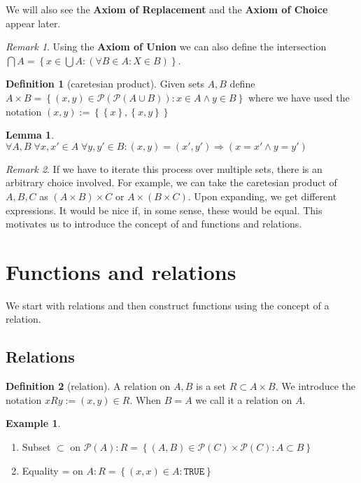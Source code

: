 \documentclass{article}
\newtheorem{lemma}[theorem]{Lemma}
\theoremstyle{definition}
\newtheorem{definition}{Definition}[subsection]
\newtheorem{eg}{Example}[subsection]
\theoremstyle{remark}
\newtheorem*{remark}{Remark}
\theoremstyle{plain}
\begin{document}
We will also see the \textbf{Axiom of Replacement} and the \textbf{Axiom of Choice} appear later.

\begin{remark}
    Using the \textbf{Axiom of Union} we can also define the intersection \(\bigcap A = \left\{ x \in \bigcup A : (\forall B\in A: X\in B) \right\}\).
\end{remark}

\begin{definition}[caretesian product]
    Given sets \(A, B\) define \(A\times B = \left\{ (x,y) \in \mathcal{P}(\mathcal{P}(A\cup B)) : x \in A \land y \in B \right\}\) where we have used the notation \((x,y):= \left\{ \left\{ x \right\}, \left\{ x,y \right\} \right\}\)
\end{definition}

\begin{lemma}
    \(\forall A,B \; \forall x, x' \in A \; \forall y,y' \in B: (x,y) = (x',y') \Rightarrow (x = x' \land y = y')\)
\end{lemma}

\begin{remark}
    If we have to iterate this process over multiple sets, there is an arbitrary choice involved. For example, we can take the caretesian product of \(A,B,C\) as \((A\times B)\times C\) or \(A\times (B\times C)\). Upon expanding, we get different expressions. It would be nice if, in some sense, these would be equal. This motivates us to introduce the concept of and functions and relations. 
\end{remark}

\section{Functions and relations}
We start with relations and then construct functions using the concept of a relation. 

\subsection{Relations}
\begin{definition}[relation]
    A relation on \(A, B\) is a set \(R \subset A\times B\). We introduce the notation \(xRy:= (x,y)\in R\). When \(B = A\) we call it a relation on \(A\).
\end{definition}

\begin{eg}
    \begin{enumerate}
        \item Subset \(\subset\) on \(\mathcal{P}(A): R = \left\{ (A,B) \in \mathcal{P}(C) \times \mathcal{P}(C): A\subset B\right\}\)
        \item Equality = on \(A: R = \left\{ (x,x)\in A: \texttt{TRUE} \right\}\)
    \end{enumerate}
\end{eg}
\end{document}
